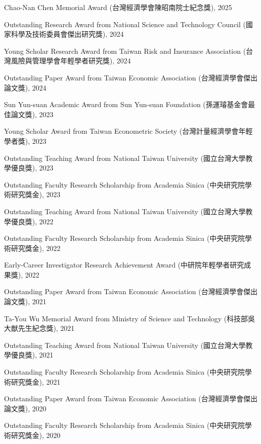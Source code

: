 \documentclass[10pt,letterpaper]{article}
\renewenvironment{itemize}{
  \begin{list}{}{
      \setlength{\leftmargin}{1.5em}
      \setlength{\itemsep}{0.25em}
      \setlength{\parskip}{0pt}
      \setlength{\parsep}{0.25em}
    }
}{
  \end{list}
}
\begin{document}
\begin{itemize}
	\item Chao-Nan Chen Memorial Award (台灣經濟學會陳昭南院士紀念獎), 2025
    \item 	Outstanding Research Award from National Science and Technology Council (國家科學及技術委員會傑出研究獎), 2024
	\item Young Scholar Research Award from Taiwan Risk and Insurance Association (台灣風險與管理學會年輕學者研究獎), 2024
		\item Outstanding Paper Award from Taiwan Economic Association (台灣經濟學會傑出論文獎), 2024
	\item Sun Yun-suan Academic Award from Sun Yun-suan Foundation (孫運璿基金會最佳論文獎), 2023
	\item Young Scholar Award from Taiwan Econometric Society (台灣計量經濟學會年輕學者獎), 2023
	\item Outstanding Teaching Award from National Taiwan University (國立台灣大學教學優良獎), 2023	
	\item Outstanding Faculty Research Scholarship from Academia Sinica (中央研究院學術研究獎金), 2023
	\item Outstanding Teaching Award from National Taiwan University (國立台灣大學教學優良獎), 2022
	\item Outstanding Faculty Research Scholarship from Academia Sinica (中央研究院學術研究獎金), 2022
	\item Early-Career Investigator Research Achievement Award (中研院年輕學者研究成果獎), 2022		
	\item Outstanding Paper Award from Taiwan Economic Association (台灣經濟學會傑出論文獎), 2021
	\item Ta-You Wu Memorial Award from Ministry of Science and Technology (科技部吳大猷先生紀念獎), 2021
	\item Outstanding Teaching Award from National Taiwan University (國立台灣大學教學優良獎), 2021
	\item Outstanding Faculty Research Scholarship from Academia Sinica (中央研究院學術研究獎金), 2021
	\item Outstanding Paper Award from Taiwan Economic Association (台灣經濟學會傑出論文獎), 2020
	\item Outstanding Faculty Research Scholarship from Academia Sinica (中央研究院學術研究獎金), 2020
\end{itemize}
\end{document}
